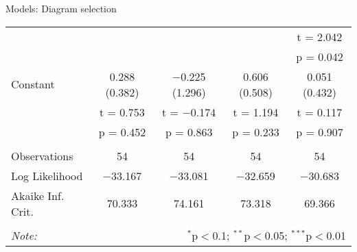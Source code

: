 \documentclass{beamer}
\begin{document}
\begin{frame}{Models: Diagram selection}
\begin{center}
{\begin{tabular}{@{\extracolsep{5pt}}lcccc}
  &  &  &  & t = 2.042 \\ 
  &  &  &  & p = 0.042 \\ 
  Constant & 0.288 (0.382) & $-$0.225 (1.296) & 0.606 (0.508) & 0.051 (0.432) \\ 
  & t = 0.753 & t = $-$0.174 & t = 1.194 & t = 0.117 \\ 
  & p = 0.452 & p = 0.863 & p = 0.233 & p = 0.907 \\ 
 \hline \\[-1.8ex] 
Observations & 54 & 54 & 54 & 54 \\ 
Log Likelihood & $-$33.167 & $-$33.081 & $-$32.659 & $-$30.683 \\ 
Akaike Inf. Crit. & 70.333 & 74.161 & 73.318 & 69.366 \\ 
\hline 
\hline \\[-1.8ex] 
\textit{Note:}  & \multicolumn{4}{r}{$^{*}$p$<$0.1; $^{**}$p$<$0.05; $^{***}$p$<$0.01} \\ 
\end{tabular} 
} 
\end{center}

\end{frame}
\end{document}
